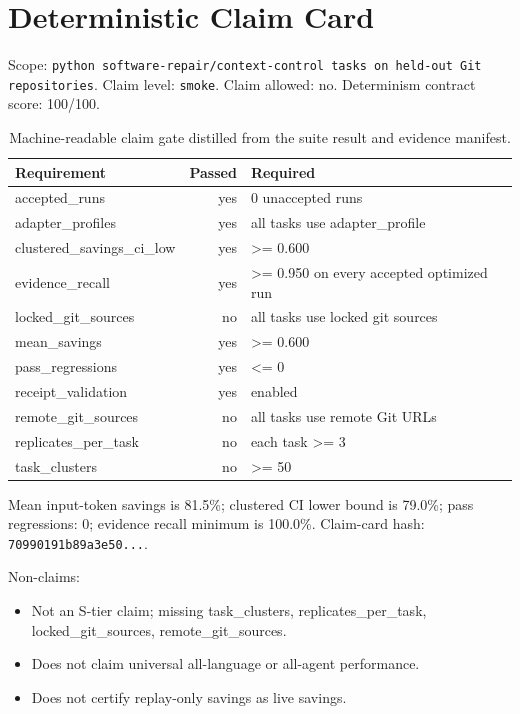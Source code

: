 \documentclass[10pt]{article}
\begin{document}
        \section{Deterministic Claim Card}
Scope: \texttt{python software-repair/context-control tasks on held-out Git repositories}. Claim level: \texttt{smoke}. Claim allowed: no. Determinism contract score: 100/100.

\begin{table}[h]
\centering
\begin{tabular}{lrl}
\toprule
Requirement & Passed & Required \\
\midrule
accepted\_runs & yes & 0 unaccepted runs \\
adapter\_profiles & yes & all tasks use adapter\_profile \\
clustered\_savings\_ci\_low & yes & >= 0.600 \\
evidence\_recall & yes & >= 0.950 on every accepted optimized run \\
locked\_git\_sources & no & all tasks use locked git sources \\
mean\_savings & yes & >= 0.600 \\
pass\_regressions & yes & <= 0 \\
receipt\_validation & yes & enabled \\
remote\_git\_sources & no & all tasks use remote Git URLs \\
replicates\_per\_task & no & each task >= 3 \\
task\_clusters & no & >= 50 \\
\bottomrule
\end{tabular}
\caption{Machine-readable claim gate distilled from the suite result and evidence manifest.}
\end{table}

Mean input-token savings is 81.5\%; clustered CI lower bound is 79.0\%; pass regressions: 0; evidence recall minimum is 100.0\%. Claim-card hash: \texttt{70990191b89a3e50...}.

\noindent Non-claims:
\begin{itemize}
\item Not an S-tier claim; missing task\_clusters, replicates\_per\_task, locked\_git\_sources, remote\_git\_sources.
\item Does not claim universal all-language or all-agent performance.
\item Does not certify replay-only savings as live savings.
\end{itemize}
\end{document}

